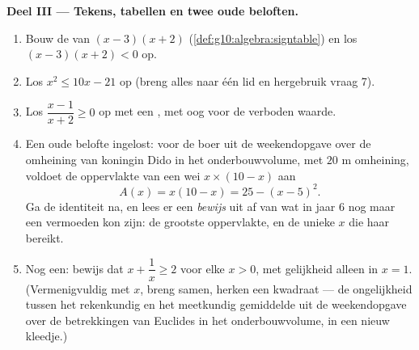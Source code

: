 \begin{problem}[{Weekendopgave --- som-en-productvraagstukken, het kwadraat
aanvullen zoals al-Chwarizmi het tekende, en de vergelijking
$x^2 = x + 1$}]
\medskip
\noindent\textbf{Deel III --- Tekens, tabellen en twee oude beloften.}
\begin{enumerate}[resume]
  \item Bouw de  van $(x - 3)(x + 2)$
        (\cref{def:g10:algebra:signtable}) en los $(x - 3)(x + 2) < 0$ op.
  \item Los $x^2 \leq 10x - 21$ op (breng alles naar één lid en hergebruik
        vraag 7).
  \item Los $\dfrac{x - 1}{x + 2} \geq 0$ op met een , met oog voor
        de verboden waarde.
  \item Een oude belofte ingelost: voor de boer uit de weekendopgave over de
        omheining van koningin Dido in het onderbouwvolume, met $20$ m
        omheining, voldoet de oppervlakte van een wei $x \times (10 - x)$ aan
        \[
        A(x) = x(10 - x) = 25 - (x - 5)^2 .
        \]
        Ga de identiteit na, en lees er een \emph{bewijs} uit af van wat in
        jaar 6 nog maar een vermoeden kon zijn: de grootste oppervlakte, en
        de unieke $x$ die haar bereikt.
  \item Nog een: bewijs dat $x + \dfrac1x \geq 2$ voor elke $x > 0$, met
        gelijkheid alleen in $x = 1$. (Vermenigvuldig met $x$, breng samen,
        herken een kwadraat --- de ongelijkheid tussen het rekenkundig en het
        meetkundig gemiddelde uit de weekendopgave over de betrekkingen van
        Euclides in het onderbouwvolume, in een nieuw kleedje.)
\end{enumerate}


\end{problem}
